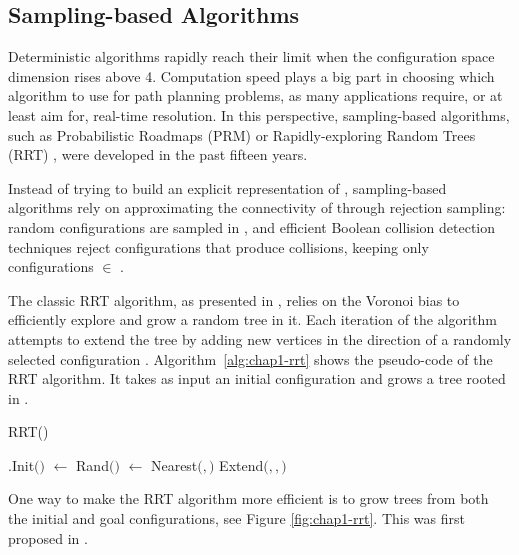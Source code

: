 \subsection{Sampling-based Algorithms}
\label{subsec:chap1-sampling-algorithms}

Deterministic algorithms rapidly reach their limit when the
configuration space dimension rises above 4. Computation speed plays a
big part in choosing which algorithm to use for path planning
problems, as many applications require, or at least aim for, real-time
resolution. In this perspective, sampling-based algorithms, such as
Probabilistic Roadmaps (PRM) \cite{kavr96} or Rapidly-exploring Random
Trees (RRT) \cite{kuff00}, were developed in the past fifteen years.

Instead of trying to build an explicit representation of \cfree,
sampling-based algorithms rely on approximating the connectivity
of \cfree through rejection sampling: random configurations
 are sampled in \cspace, and efficient Boolean collision
detection techniques \cite{vand97, huds97, gott96} reject
configurations that produce collisions, keeping only configurations
\config{} $\in$ \cfree.

The classic RRT algorithm, as presented in \cite{kuff00}, relies on
the Voronoi bias to efficiently explore \cfree and grow a random tree
in it. Each iteration of the algorithm attempts to extend the tree by
adding new vertices in the direction of a randomly selected
configuration . Algorithm~\ref{alg:chap1-rrt} shows the
pseudo-code of the RRT algorithm. It takes as input an initial
configuration  and grows a tree \ctree rooted in .

\begin{algorithm}
\caption{RRT()}
\label{alg:chap1-rrt}
\begin{algorithmic}
\STATE \ctree$.$Init$($$)$
\STATE {} $ \leftarrow $ Rand$($\cspace$)$
\STATE {}$ \leftarrow $ Nearest$($$,$\ctree$)$
\STATE Extend$($\ctree$,$$,$$)$
\ENDFOR
\end{algorithmic}
\end{algorithm}

One way to make the RRT algorithm more efficient is to grow trees from
both the initial and goal configurations, see Figure
\ref{fig:chap1-rrt}. This was first proposed in \cite{kuff00}.

